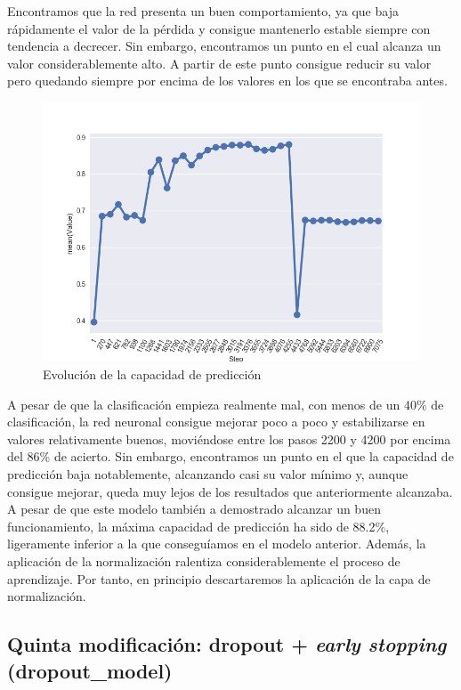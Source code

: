 \documentclass[11pt]{article}
\theoremstyle{plain}
\theoremstyle{definition}
\begin{document}
Encontramos que la red presenta un buen comportamiento, ya que baja
rápidamente el valor de la pérdida y consigue mantenerlo estable
siempre con tendencia a decrecer. Sin embargo, encontramos un punto 
en el cual alcanza un valor considerablemente alto. A partir de este 
punto consigue reducir su valor pero quedando siempre por encima de 
los valores en los que se encontraba antes.


\begin{figure}[H]
  \centering \includegraphics[width=.95\textwidth]{imgs/accuracy_norm}
  \caption{Evolución de la capacidad de predicción}
\end{figure}

A pesar de que la clasificación empieza realmente mal, con menos de un 
40\% de clasificación, la red neuronal consigue mejorar poco a poco y
estabilizarse en valores relativamente buenos, moviéndose entre los 
pasos 2200 y 4200 por encima del 86\% de acierto. Sin embargo, 
encontramos un punto en el que la capacidad de predicción baja 
notablemente, alcanzando casi su valor mínimo y, aunque consigue mejorar,
queda muy lejos de los resultados que anteriormente alcanzaba.\\

A pesar de que este modelo también a demostrado alcanzar un buen 
funcionamiento, la máxima capacidad de predicción ha sido de 88.2\%,
ligeramente inferior a la que conseguíamos en el modelo anterior. Además,
la aplicación de la normalización ralentiza considerablemente el proceso
de aprendizaje. Por tanto, en principio descartaremos la aplicación de
la capa de normalización. 


\subsection{Quinta modificación: dropout + \textit{early stopping}
  (dropout\_model)}
\end{document}

